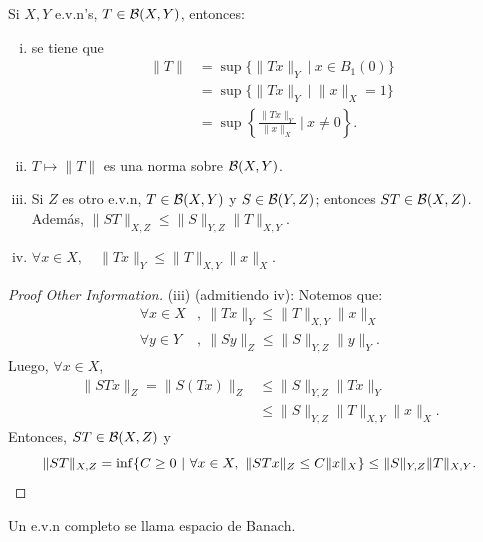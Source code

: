 \begin{prop}
	Si $X,Y$ e.v.n's, $T \in \mathcal{B}(X,Y)$, entonces:
	\begin{enumerate}[i)]
		\item se tiene que
		\begin{align*}
			\| T \| &= \sup \{\| Tx \|_{Y} \ | \ x \in B_{1}(0)\} \\
			&= \sup \{\| Tx \|_{Y} \ | \ \| x \|_{X} = 1\} \\
			&= \sup \left\{ \frac{\| Tx \|_{Y}}{\| x \|_{X}} \ \Big| \ x \neq 0 \right\}  
		.\end{align*}

		\item $T \mapsto \| T \|$ es una norma sobre $\mathcal{B}(X,Y)$.

		\item Si $Z$ es otro e.v.n, $T \in \mathcal{B}(X,Y)$ y $S \in \mathcal{B}(Y,Z)$; entonces $ST \in \mathcal{B}(X,Z)$. Además, $\| ST \|_{X,Z} \leq \| S \|_{Y,Z} \| T \|_{X,Y}$.

		\item $\forall x \in X, \quad \| Tx \|_{Y} \leq \| T \|_{X,Y} \| x \|_{X}$.
	\end{enumerate}
\end{prop}
\begin{proof}[Proof Other Information]
	(iii) (admitiendo iv): Notemos que:
	\begin{align*}
		\forall x \in X &,\ \| Tx \|_{Y} \leq \| T \|_{X,Y} \| x \|_{X} \\
		\forall y \in Y &,\ \| Sy \|_{Z} \leq \| S \|_{Y,Z} \| y \|_{Y}
	.\end{align*}
	Luego, $\forall x \in X$,
	\begin{align*}
		\| STx \|_{Z} = \| S(Tx) \|_{Z} &\leq \| S \|_{Y,Z} \| Tx \|_{Y} \\
		&\leq \| S \|_{Y,Z} \| T \|_{X,Y} \| x \|_{X}
	.\end{align*}
	Entonces, $ST \in \mathcal{B}(X,Z)$ y
	\[ \| ST \|_{X,Z} = \inf \{C \geq 0 \ | \ \forall x \in X,\ \| STx \|_{Z} \leq C \| x \|_{X}\} \leq \| S \|_{Y,Z} \| T \|_{X,Y}. \qedhere \] 
\end{proof}

\begin{definition}
	Un e.v.n completo se llama espacio de Banach.
\end{definition}

